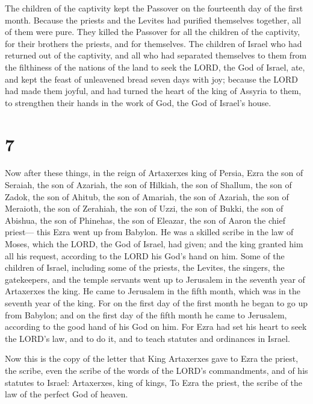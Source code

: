  The children of the captivity kept the Passover on the
fourteenth day of the first month.  Because the priests
and the Levites had purified themselves together, all of them were pure.
They killed the Passover for all the children of the captivity, for
their brothers the priests, and for themselves.  The
children of Israel who had returned out of the captivity, and all who
had separated themselves to them from the filthiness of the nations of
the land to seek the LORD, the God of Israel, ate,  and
kept the feast of unleavened bread seven days with joy; because the LORD
had made them joyful, and had turned the heart of the king of Assyria to
them, to strengthen their hands in the work of God, the God of Israel's
house.

\hypertarget{section-6}{%
\section{7}\label{section-6}}

 Now after these things, in the reign of Artaxerxes king
of Persia, Ezra the son of Seraiah, the son of Azariah, the son of
Hilkiah,  the son of Shallum, the son of Zadok, the son of
Ahitub,  the son of Amariah, the son of Azariah, the son
of Meraioth,  the son of Zerahiah, the son of Uzzi, the
son of Bukki,  the son of Abishua, the son of Phinehas,
the son of Eleazar, the son of Aaron the chief priest--- 
this Ezra went up from Babylon. He was a skilled scribe in the law of
Moses, which the LORD, the God of Israel, had given; and the king
granted him all his request, according to the LORD his God's hand on
him.  Some of the children of Israel, including some of
the priests, the Levites, the singers, the gatekeepers, and the temple
servants went up to Jerusalem in the seventh year of Artaxerxes the
king.  He came to Jerusalem in the fifth month, which was
in the seventh year of the king.  For on the first day of
the first month he began to go up from Babylon; and on the first day of
the fifth month he came to Jerusalem, according to the good hand of his
God on him.  For Ezra had set his heart to seek the
LORD's law, and to do it, and to teach statutes and ordinances in
Israel.

 Now this is the copy of the letter that King Artaxerxes
gave to Ezra the priest, the scribe, even the scribe of the words of the
LORD's commandments, and of his statutes to Israel: 
Artaxerxes, king of kings, To Ezra the priest, the scribe of the law of
the perfect God of heaven.

